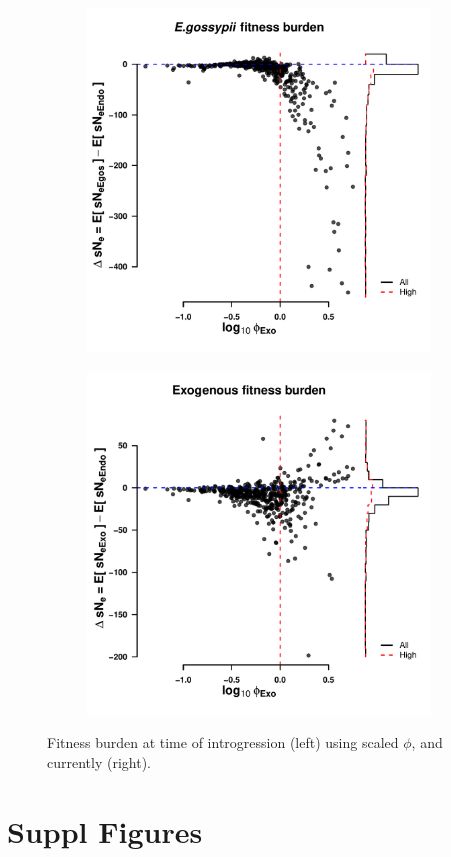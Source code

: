 \documentclass[12pt]{article}
\begin{document}
\begin{figure}[h]
    \centering
    \begin{subfigure}
        \centering
        \includegraphics[width=.45\textwidth]{img/fitness_difference_gos_kappa5.pdf}
    \end{subfigure}
    \begin{subfigure}
        \centering
        \includegraphics[width=.45\textwidth]{img/fitness_difference_exo.pdf}
    \end{subfigure}
    \caption{Fitness burden at time of introgression (left) using scaled $\phi$, and currently (right). }
    \label{fig:sne_fitness_burden}
\end{figure}

\clearpage
\section*{Suppl Figures}
\end{document}
